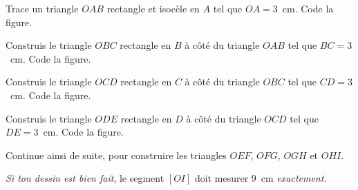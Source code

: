 \begin{myenumerate}
  \item Trace un triangle $OAB$ rectangle et isocèle en $A$ tel que
    $OA=3$~cm. Code la figure.
  \item Construis le triangle $OBC$ rectangle en $B$ à côté du
    triangle $OAB$ tel que $BC=3$~cm. Code la figure.
  \item Construis le triangle $OCD$ rectangle en $C$ à côté du
    triangle $OBC$ tel que $CD=3$~cm. Code la figure.
  \item Construis le triangle $ODE$ rectangle en $D$ à côté du
    triangle $OCD$ tel que $DE=3$~cm. Code la figure.
  \item Continue ainsi de suite, pour construire les triangles $OEF$,
    $OFG$, $OGH$ et $OHI$.
\end{myenumerate}
{\em Si ton dessin est bien fait}, le segment $[OI]$ doit mesurer 9~cm
{\em exactement}.